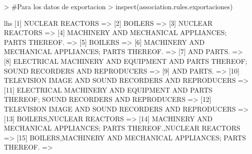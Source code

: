 \documentclass [a4paper] {article}
\begin{document}
{\scriptsize
\begin{Schunk}
\begin{Sinput}
> #Para los datos de exportacion
> inspect(association.rules.exportaciones)
\end{Sinput}
\begin{Soutput}
     lhs                                                                                                                                            
[1]  {NUCLEAR REACTORS}                                                                                                                           =>
[2]  {BOILERS}                                                                                                                                    =>
[3]  {NUCLEAR REACTORS}                                                                                                                           =>
[4]  {MACHINERY AND MECHANICAL APPLIANCES; PARTS THEREOF.}                                                                                        =>
[5]  {BOILERS}                                                                                                                                    =>
[6]  {MACHINERY AND MECHANICAL APPLIANCES; PARTS THEREOF.}                                                                                        =>
[7]  {AND PARTS.}                                                                                                                                 =>
[8]  {ELECTRICAL MACHINERY AND EQUIPMENT AND PARTS THEREOF; SOUND RECORDERS AND REPRODUCERS}                                                      =>
[9]  {AND PARTS.}                                                                                                                                 =>
[10] {TELEVISION IMAGE AND SOUND RECORDERS AND REPRODUCERS}                                                                                       =>
[11] {ELECTRICAL MACHINERY AND EQUIPMENT AND PARTS THEREOF; SOUND RECORDERS AND REPRODUCERS}                                                      =>
[12] {TELEVISION IMAGE AND SOUND RECORDERS AND REPRODUCERS}                                                                                       =>
[13] {BOILERS,NUCLEAR REACTORS}                                                                                                                   =>
[14] {MACHINERY AND MECHANICAL APPLIANCES; PARTS THEREOF.,NUCLEAR REACTORS}                                                                       =>
[15] {BOILERS,MACHINERY AND MECHANICAL APPLIANCES; PARTS THEREOF.}                                                                                =>

\end{Soutput}
\end{Schunk}}
\end{document}
